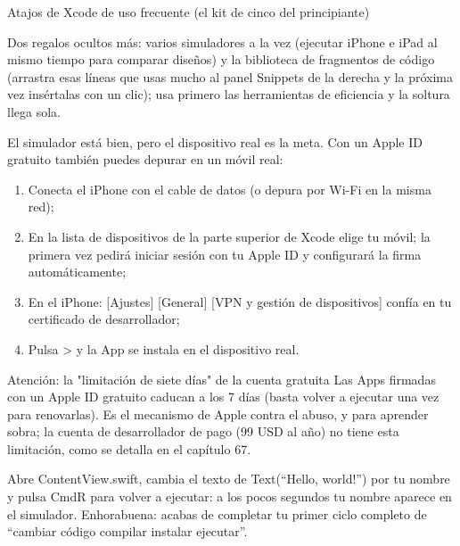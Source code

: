 \begin{center}\small\color{gray}Atajos de Xcode de uso frecuente (el kit de cinco del principiante)\end{center}

Dos regalos ocultos más: varios simuladores a la vez (ejecutar iPhone e iPad al mismo tiempo para comparar diseños) y la biblioteca de fragmentos de código (arrastra esas líneas que usas mucho al panel Snippets de la derecha y la próxima vez insértalas con un clic); usa primero las herramientas de eficiencia y la soltura llega sola.


El simulador está bien, pero el dispositivo real es la meta. Con un Apple ID gratuito también puedes depurar en un móvil real:

\begin{enumerate}
  \item Conecta el iPhone con el cable de datos (o depura por Wi-Fi en la misma red);
  \item En la lista de dispositivos de la parte superior de Xcode elige tu móvil; la primera vez pedirá iniciar sesión con tu Apple ID y configurará la firma automáticamente;
  \item En el iPhone: [Ajustes] [General] [VPN y gestión de dispositivos] confía en tu certificado de desarrollador;
  \item Pulsa > y la App se instala en el dispositivo real.
\end{enumerate}

\begin{tcbwarn}{Atención: la "limitación de siete días" de la cuenta gratuita}
Las Apps firmadas con un Apple ID gratuito caducan a los 7 días (basta volver a ejecutar una vez para renovarlas). Es el mecanismo de Apple contra el abuso, y para aprender sobra; la cuenta de desarrollador de pago (99 USD al año) no tiene esta limitación, como se detalla en el capítulo 67.

\end{tcbwarn}



Abre ContentView.swift, cambia el texto de Text(“Hello, world!”) por tu nombre y pulsa CmdR para volver a ejecutar: a los pocos segundos tu nombre aparece en el simulador. Enhorabuena: acabas de completar tu primer ciclo completo de “cambiar código compilar instalar ejecutar”.

